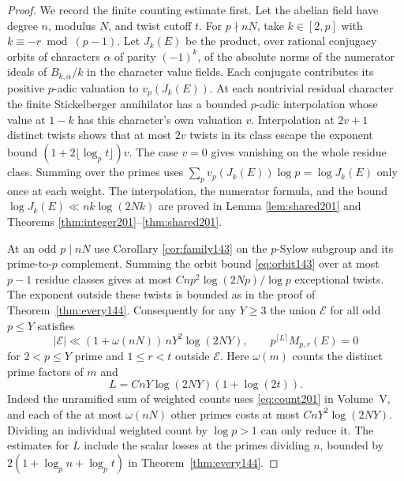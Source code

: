 \documentclass[a4paper,11pt]{article}
\theoremstyle{definition}
\theoremstyle{remark}
\numberwithin{equation}{section}
\begin{document}
\begin{proof}
We record the finite counting estimate first. Let the abelian field
have degree \(n\), modulus \(N\), and twist cutoff \(t\). For
\(p\nmid nN\), take \(k\in[2,p]\) with \(k\equiv-r\bmod(p-1)\).
Let \(J_k(E)\) be the product, over rational conjugacy orbits of
characters \(\alpha\) of parity \((-1)^k\), of the absolute norms
of the numerator ideals of \(B_{k,\bar\alpha}/k\) in the character
value fields. Each conjugate contributes its positive \(p\)-adic
valuation to \(v_p(J_k(E))\). At each nontrivial residual character
the finite Stickelberger annihilator has a bounded \(p\)-adic
interpolation whose value at \(1-k\) has this character's own
valuation \(v\). Interpolation at \(2v+1\) distinct twists shows
that at most \(2v\) twists in its class escape the exponent bound
\((1+2\lfloor\log_p t\rfloor)v\). The case \(v=0\) gives
vanishing on the whole residue class. Summing over the primes
uses \(\sum_p v_p(J_k(E))\log p=\log J_k(E)\) only once at each
weight. The interpolation, the numerator formula, and the bound
\(\log J_k(E)\ll nk\log(2Nk)\) are proved in
Lemma \ref{lem:shared201} and Theorems \ref{thm:integer201}--\ref{thm:shared201}.

At an odd \(p\mid nN\) use
Corollary \ref{cor:family143}
on the \(p\)-Sylow subgroup and its prime-to-\(p\) complement.
Summing the orbit bound \eqref{eq:orbit143} over at most \(p-1\) residue classes
gives at most \(Cnp^2\log(2Np)/\log p\) exceptional twists.
The exponent outside these twists is bounded as in the proof of
Theorem~\ref{thm:every144}. Consequently for any \(Y\ge3\) the
union \(\mathcal E\) for all odd \(p\le Y\) satisfies
\[
 |\mathcal E|\ll (1+\omega(nN))\,nY^2\log(2NY),
 \qquad
 p^{\lceil L\rceil}M_{p,r}(E)=0
\]
for \(2<p\le Y\) prime and \(1\le r<t\) outside \(\mathcal E\).
Here \(\omega(m)\) counts the distinct prime factors of \(m\) and
\[
                 L=CnY\log(2NY)(1+\log(2t)).
\]
Indeed the unramified sum of weighted counts uses \eqref{eq:count201} in
Volume~V, and each of the at most \(\omega(nN)\) other primes
costs at most \(CnY^2\log(2NY)\). Dividing an individual weighted
count by \(\log p>1\) can only reduce it. The estimates for \(L\)
include the scalar losses at the primes dividing \(n\), bounded
by \(2(1+\log_p n+\log_p t)\) in Theorem~\ref{thm:every144}.


\end{proof}
\end{document}

